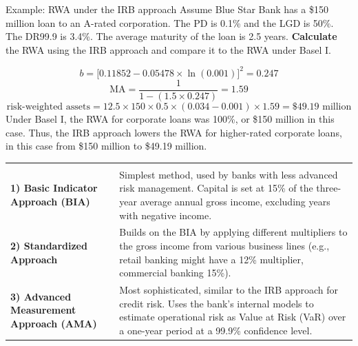 \begin{orexambox}{Example: RWA under the IRB approach}
Assume Blue Star Bank has a \$150 million loan to an A-rated corporation. The PD is
0.1\% and the LGD is 50\%. The DR99.9 is 3.4\%. The average maturity of the loan is
2.5 years. \textbf{Calculate} the RWA using the IRB approach and compare it to the
RWA under Basel I.

\vspace{6pt}
\par
\[
b=\bigl[0.11852-0.05478\times\ln(0.001)\bigr]^{2}=0.247
\]
\[
\mathrm{MA}=\frac{1}{1-(1.5\times0.247)}=1.59
\]
\[
\text{risk-weighted assets}=12.5\times150\times0.5\times(0.034-0.001)\times1.59
=\$49.19\text{ million}
\]
Under Basel I, the RWA for corporate loans was 100\%, or \$150 million in this
case. Thus, the IRB approach lowers the RWA for higher-rated corporate loans, in
this case from \$150 million to \$49.19 million.
\end{orexambox}



\noindent\begin{minipage}{\textwidth}
\renewcommand{\arraystretch}{1.32}
\begin{tabularx}{\textwidth}{@{}L{0.26\textwidth}Y@{}}
  & \\
{\tabfont \textbf{1) Basic Indicator Approach (BIA)}} &
{\tabfont Simplest method, used by banks with less advanced risk management.
Capital is set at 15\% of the three-year average annual gross income, excluding
years with negative income.}\\
{\tabfont \textbf{2) Standardized Approach}} &
{\tabfont Builds on the BIA by applying different multipliers to the gross income
from various business lines (e.g., retail banking might have a 12\% multiplier,
commercial banking 15\%).}\\
{\tabfont \textbf{3) Advanced Measurement Approach (AMA)}} &
{\tabfont Most sophisticated, similar to the IRB approach for credit risk. Uses the
bank's internal models to estimate operational risk as Value at Risk (VaR) over a
one-year period at a 99.9\% confidence level.}\\
\end{tabularx}
\end{minipage}

